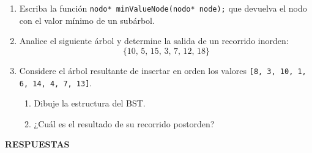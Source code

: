 \documentclass[12pt]{article}
\begin{document}
\begin{titlepage}
\begin{enumerate}[leftmargin=*]
            \item Escriba la función \texttt{nodo* minValueNode(nodo* node);} que devuelva el nodo con el valor mínimo de un subárbol.
            
            \item Analice el siguiente árbol y determine la salida de un recorrido inorden:
            \[ \{10,\,5,\,15,\,3,\,7,\,12,\,18\}\]
            
            \item Considere el árbol resultante de insertar en orden los valores \texttt{[8, 3, 10, 1, 6, 14, 4, 7, 13]}.
            \begin{enumerate}[label=\alph*)]
                \item Dibuje la estructura del BST.
                \item ¿Cuál es el resultado de su recorrido postorden?
            \end{enumerate}
        \end{enumerate}
    \end{titlepage}

    \newpage
        \begin{center}
            \textbf{RESPUESTAS}
        \end{center}
\end{document}
